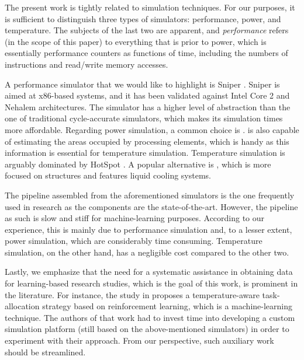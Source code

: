 The present work is tightly related to simulation techniques. For our purposes,
it is sufficient to distinguish three types of simulators: performance, power,
and temperature. The subjects of the last two are apparent, and
\emph{performance} refers (in the scope of this paper) to everything that is
prior to power, which is essentially performance counters as functions of time,
including the numbers of instructions and read/write memory accesses.

A performance simulator that we would like to highlight is Sniper
\cite{carlson2011}. Sniper is aimed at x86-based systems, and it has been
validated against Intel Core 2 and Nehalem architectures. The simulator has a
higher level of abstraction than the one of traditional cycle-accurate
simulators, which makes its simulation times more affordable. Regarding power
simulation, a common choice is  \cite{li2009}.  is also
capable of estimating the areas occupied by processing elements, which is handy
as this information is essential for temperature simulation. Temperature
simulation is arguably dominated by HotSpot \cite{skadron2004}. A popular
alternative is  \cite{sridhar2010}, which is more focused on 
structures and features liquid cooling systems.

The pipeline assembled from the aforementioned simulators is the one frequently
used in research as the components are the state-of-the-art. However, the
pipeline as such is slow and stiff for machine-learning purposes. According to
our experience, this is mainly due to performance simulation and, to a lesser
extent, power simulation, which are considerably time consuming. Temperature
simulation, on the other hand, has a negligible cost compared to the other two.

Lastly, we emphasize that the need for a systematic assistance in obtaining data
for learning-based research studies, which is the goal of this work, is
prominent in the literature. For instance, the study in \cite{lu2015} proposes a
temperature-aware task-allocation strategy based on reinforcement learning,
which is a machine-learning technique. The authors of that work had to invest
time into developing a custom simulation platform (still based on the
above-mentioned simulators) in order to experiment with their approach. From our
perspective, such auxiliary work should be streamlined.
